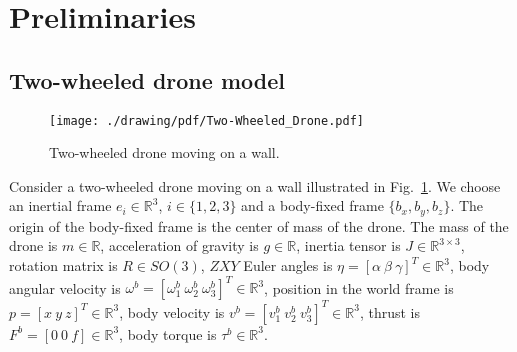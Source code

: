 
\section{Preliminaries}
\subsection{Two-wheeled drone model}
\begin{figure}[t]
    \centering
    \texttt{[image: ./drawing/pdf/Two-Wheeled\_Drone.pdf]}
    \caption{Two-wheeled drone moving on a wall.}
    \label{fig:two-wheeled_drone_moving_on_a_wall}
\end{figure}

Consider a two-wheeled drone moving on a wall illustrated in Fig.~\ref{fig:two-wheeled_drone_moving_on_a_wall}.
We choose an inertial frame $e_i \in \mathbb{R}^3$, $i \in \{1, 2, 3 \}$ and a body-fixed frame $\{b_x, b_y, b_z\}$.
The origin of the body-fixed frame is the center of mass of the drone.
The mass of the drone is $m \in \mathbb{R}$, acceleration of gravity is $g \in \mathbb{R}$, inertia tensor is $J \in \mathbb{R}^{3 \times 3}$, rotation matrix is $R \in SO(3)$, $ZXY$ Euler angles is $\eta = [\alpha ~ \beta ~ \gamma]^T \in \mathbb{R}^3$, body angular velocity is $\omega^b = [\omega_1^b ~ \omega_2^b ~ \omega_3^b]^T \in \mathbb{R}^3$, position in the world frame is $p = [x ~ y ~ z]^T \in \mathbb{R}^3$, body velocity is $v^b = [v_1^b ~ v_2^b ~ v_3^b]^T \in \mathbb{R}^ 3$, thrust is $F^b = [0 ~ 0 ~ f] \in \mathbb{R}^3$, body torque is $\tau^b \in \mathbb{R}^3$.

